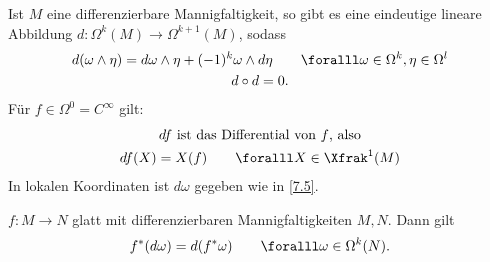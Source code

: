 \begin{thm}
	Ist $M$ eine differenzierbare Mannigfaltigkeit, so gibt es eine eindeutige lineare Abbildung $ d: \Omega^k(M) \to \Omega^{k+1}(M) $, sodass
	\begin{gather*}
		d(\omega \wedge \eta) = d\omega \wedge \eta + (-1)^k \omega \wedge d \eta \qquad \foralll \omega \in \Omega^k, \eta \in \Omega^l\\
		d \circ d = 0.
	\end{gather*}
	Für $ f \in \Omega^0 = C^\infty $ gilt:
	\begin{gather*}
		df \ \text{ist das Differential von $f$, also}\\
		df(X) = X(f) \qquad \foralll X \in \Xfrak^1(M)
	\end{gather*}
	In lokalen Koordinaten ist $d\omega$ gegeben wie in \ref{7.5}.
\end{thm}

\begin{lem}
	$ f: M \to N $ glatt mit differenzierbaren Mannigfaltigkeiten $M,N$. Dann gilt
	\[ f^*(d\omega) = d(f^*\omega) \qquad \foralll \omega \in \Omega^k(N). \]
\end{lem}